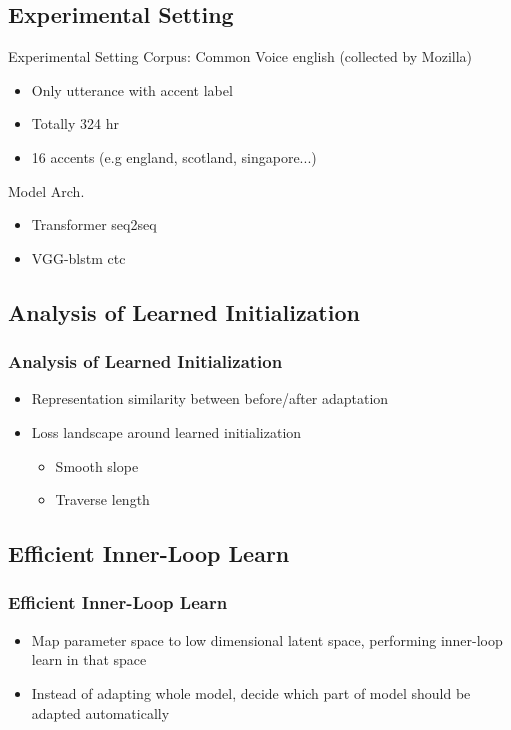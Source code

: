 \documentclass{beamer}
\begin{document}
\subsection{Experimental Setting}
\begin{frame}[t]{Experimental Setting}
  Corpus: Common Voice english (collected by Mozilla)

  \begin{itemize}
    \item Only utterance with accent label
    \item Totally 324 hr
    \item 16 accents (e.g england, scotland, singapore...)
  \end{itemize}

  Model Arch.
  \begin{itemize}
    \item Transformer seq2seq
    \item VGG-blstm ctc
  \end{itemize}
\end{frame}

\subsection{Analysis of Learned Initialization}
\begin{frame}[t]
  \frametitle{Analysis of Learned Initialization}
  \begin{itemize}
    \item Representation similarity between before/after adaptation
    \item Loss landscape around learned initialization
      \begin{itemize}
        \item Smooth slope
        \item Traverse length
      \end{itemize}
  \end{itemize}
\end{frame}


\subsection{Efficient Inner-Loop Learn}
\begin{frame}[t]
  \frametitle{Efficient Inner-Loop Learn}
  \begin{itemize}
    \item Map parameter space to low dimensional latent space, performing inner-loop learn in that space
    \item Instead of adapting whole model, decide which part of model should be adapted automatically
  \end{itemize}
\end{frame}
\end{document}

